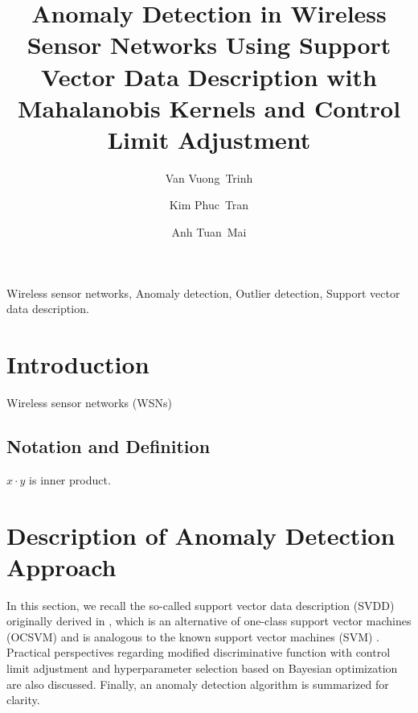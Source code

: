 \documentclass[3p]{elsarticle}
\theoremstyle{problemstyle}
\begin{document}
\begin{frontmatter}

\title{Anomaly Detection in Wireless Sensor Networks Using Support Vector Data Description with Mahalanobis Kernels and Control Limit Adjustment}

\author[danang]{Van Vuong~Trinh}

\author[danang]{Kim Phuc~Tran}

\author[hanoi]{Anh Tuan~Mai}

\address[danang]{Division of Artificial Intelligence, Faculty of Information Technology,\\ Dong A University, Danang, Vietnam} 
\address[hanoi]{International Training Institute for Materials Science (ITIMS),\\Hanoi University of Science and Technology, Hanoi, Vietnam} 

\begin{keyword}
Wireless sensor networks, Anomaly detection, Outlier detection, Support vector data description.
\end{keyword}

\begin{abstract}
\end{abstract}

\end{frontmatter}

\section{Introduction}

Wireless sensor networks (WSNs) \cite{Xie2011}

\cite{feng2017new}

\cite{Rajasegarar2014}

\subsection*{Notation and Definition}

$x \cdot y$ is inner product.

\section{Description of Anomaly Detection Approach}

In this section, we recall the so-called support vector data description (SVDD) originally derived in \cite{Tax2004}, which is an alternative of one-class support vector machines (OCSVM) \cite{scholkopf2001estimating} and is analogous to the known support vector machines (SVM) \cite{Vapnik1998}. Practical perspectives regarding modified discriminative function with control limit adjustment and hyperparameter selection based on Bayesian optimization are also discussed. Finally, an anomaly detection algorithm is summarized for clarity.
\end{document}
